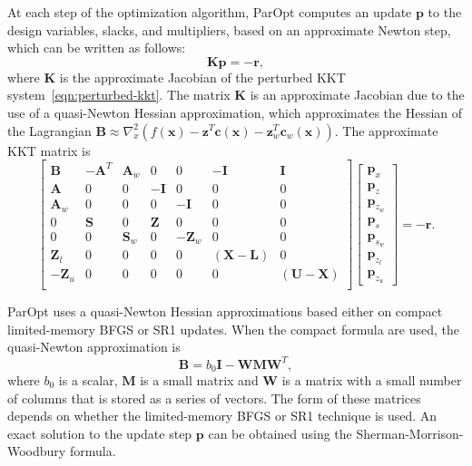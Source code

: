 \documentclass[12pt]{article}
\newcommand{\mb}{\mathbf}
\begin{document}
At each step of the optimization algorithm, ParOpt computes an update $\mb{p}$ to the design variables, slacks, and multipliers, based on an approximate Newton step, which can be written as follows:
%
\begin{equation*}
  \mb{K} \mb{p} = - \mb{r},
\end{equation*}
where $\mb{K}$ is the approximate Jacobian of the perturbed KKT system~\eqref{eqn:perturbed-kkt}.
The matrix $\mb{K}$ is an approximate Jacobian due to the use of a quasi-Newton Hessian approximation, which approximates the Hessian of the Lagrangian $\mb{B} \approx \nabla_{x}^{2} \left(f(\mb{x}) - \mb{z}^{T}\mb{c}(\mb{x}) - \mb{z}_{w}^{T}\mb{c}_{w}(\mb{x}) \right)$.
The approximate KKT matrix is
%
\begin{equation}
  \label{eqn:kkt-update}
  \begin{bmatrix}
    \mb{B}    & -\mb{A}^{T} & \mb{A}_{w} &       0 &      0 & -\mb{I} & \mb{I} \\
    \mb{A}    &           0 &         0 & -\mb{I} &      0 &       0 & 0 \\
    \mb{A}_{w} &           0 &         0 &      0 & -\mb{I} &       0 & 0 \\
    0 &               \mb{S} &        0 & \mb{Z} &       0 &       0 & 0 \\
    0 &                    0 & \mb{S}_{w} &      0 & -\mb{Z}_{w} &  0 & 0 \\
    \mb{Z}_{l} &           0 &          0 &      0 & 0 & (\mb{X} - \mb{L}) & 0 \\
    -\mb{Z}_{u} &          0 &          0 &      0 & 0 & 0 & (\mb{U} - \mb{X}) \\
  \end{bmatrix}
  \begin{bmatrix}
    \mb{p}_{x} \\
    \mb{p}_{z} \\
    \mb{p}_{z_{w}} \\
    \mb{p}_{s} \\
    \mb{p}_{s_{w}} \\
    \mb{p}_{z_{l}} \\
    \mb{p}_{z_{u}}
  \end{bmatrix} = -\mb{r}.
\end{equation}

ParOpt uses a quasi-Newton Hessian approximations based either on compact limited-memory BFGS or SR1 updates. 
When the compact formula are used, the quasi-Newton approximation is
%
\begin{equation*}
  \mb{B} = b_0\mb{I} - \mb{W}\mb{M}\mb{W}^{T},
\end{equation*}
where $b_0$ is a scalar, $\mb{M}$ is a small matrix and $\mb{W}$ is a matrix with a small number of columns that is stored as a series of vectors.
The form of these matrices depends on whether the limited-memory BFGS or SR1 technique is used. 
An exact solution to the update step $\mb{p}$ can be obtained using the Sherman-Morrison-Woodbury formula.
\end{document}
